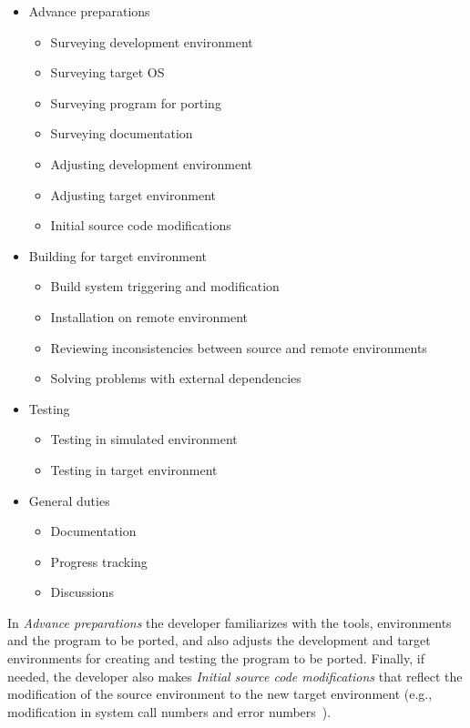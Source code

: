 \begin{itemize}
    \item Advance preparations
        \begin{itemize}
            \item Surveying development environment
            \item Surveying target OS
            \item Surveying program for porting
            \item Surveying documentation
            \item Adjusting development environment
            \item Adjusting target environment
            \item Initial source code modifications
        \end{itemize}
    \item Building for target environment
        \begin{itemize}
            \item Build system triggering and modification
            \item Installation on remote environment
            \item Reviewing inconsistencies between source and remote
            environments
            \item Solving problems with external dependencies
        \end{itemize}
    \item Testing
        \begin{itemize}
            \item Testing in simulated environment
            \item Testing in target environment
        \end{itemize}
    \item General duties
        \begin{itemize}
            \item Documentation
            \item Progress tracking
            \item Discussions
        \end{itemize}
\end{itemize}

In \textit{Advance preparations} the developer familiarizes with the tools,
environments and the program to be ported, and also adjusts the development and
target environments for creating and testing the program to be ported. Finally,
if needed, the developer also makes \textit{Initial source code modifications}
that reflect the modification of the source environment to the new target
environment (e.g., modification in system call numbers and error
numbers~\cite{callahanopenbsd}).

